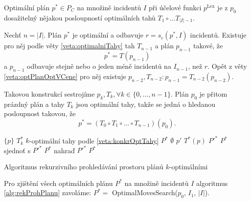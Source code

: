 \begin{veta}
  Optimální plán $p^* \in P_C$ na množině incidentů $I$ při účelové funkci $p^{\text{Lex}}$ je z $p_0$ dosažitelný nějakou posloupností optimálních tahů $T_1 \circ \dots T_{|I|-1}$.
\end{veta}
\begin{dukaz}
  Nechť $n = |I|$.
  Plán $p^*$ je optimální a odbavuje $r = s_c(p^*, I)$ incidentů.
  Existuje pro něj podle věty \ref{veta:optimalniTahy} tah $T_{n-1}$ a plán $p_{n-1}$ takové, že
  \begin{equation*}
    p^* = T(p_{n-1})
  \end{equation*}
  a $p_{n-1}$ odbavuje stejně nebo o jeden méně incidentů na $I_{n-1}$, než $r$.
  Opět z věty \ref{veta:optPlanOptVCene} pro něj existuje $p_{n-2}, T_{n-2} \colon p_{n-1} = T_{n-2}(p_{n-2})$.

  Takovou konstrukcí sestrojíme $p_{k}, T_{k}, \forall k \in \{ 0, \dots, n-1 \}$. 
  Plán $p_0$ je přitom prázdný plán a tahy $T_k$ jsou optimální tahy, takže se jedná o hledanou posloupnost takovou, že
  \begin{equation*}
    p^* = (T_0 \circ T_1 \circ \dots \circ T_{n-1})(p_0).
  \end{equation*}
\end{dukaz}

\begin{algorithm}[h]
  \begin{algorithmic}[1]
      \State \Return $\{ p \}$
    \EndIf
    \State $T^*_k$ \gets $k$-optimální tahy podle \ref{veta:konkrOptTahy}
    \State $P^*$ \gets $\emptyset$
      \State $p'$ \gets $T^*(p)$
      \State $P'^*$ \gets {}
        \State $P^*$ sjednoť s $P'^*$
        \State $P^*$ nahraď $P'^*$
      \EndIf
    \EndFor
    \State \Return $P^*$
  \EndFunction
  \end{algorithmic}
  \caption{Algoritmus rekurzivního prohledávání prostoru plánů $k$-optimálními}
  \label{alg:rekProhPlanu}
\end{algorithm}

Pro zjištění všech optimálních plánu $P^*$ na množině incidentů $I$ algoritmus \ref{alg:rekProhPlanu} zavoláme: $P^* = $ OptimalMovesSearch($p_0$, $I_1$, $|I|$).

